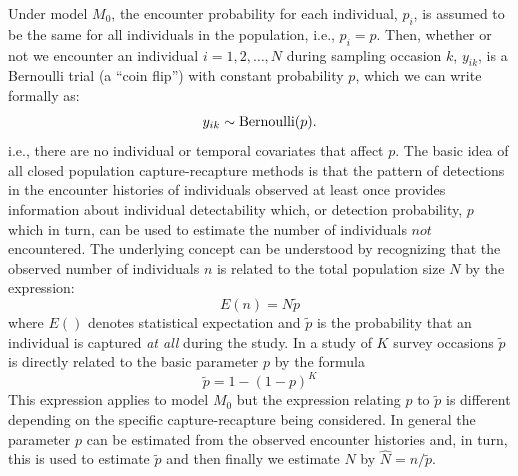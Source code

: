 \documentclass{book}
\begin{document}
Under model $M_0$, the encounter probability for each individual,
$p_i$, is assumed to be the same for all individuals in the
population, i.e., $p_i = p$. Then, whether or not we encounter an
individual $i=1,2,\ldots,N$ during sampling occasion $k$, $y_{ik}$, is a Bernoulli
trial (a ``coin flip'')
with constant probability $p$, which we can write formally as:
\[
y_{ik} \sim \hbox{Bernoulli}(p).
\]
i.e.,  there are no individual or temporal
covariates that affect $p$. The basic idea of all closed population
capture-recapture methods  is that the pattern of
detections in the encounter histories of individuals observed at least
once provides information about individual detectability which, or
detection probability, $p$ which in
turn, can be used to estimate the number of individuals $not$
encountered.  The underlying concept can be understood by recognizing
that  the observed number of
individuals $n$ is related to the total population size $N$ by the
expression:
\[
 E(n) = N\tilde{p}
\]
where $E()$ denotes statistical expectation and $\tilde{p}$ is the
probability that an individual is captured {\it at all} during the
study. In a study of $K$ survey occasions $\tilde{p}$ is directly
related to the basic parameter $p$ by the formula
\[
 \tilde{p} = 1-(1-p)^K
\]
This expression applies to model $M_0$ but the
 expression relating $p$ to $\tilde{p}$ is different depending on
the specific  capture-recapture being considered.
In general the parameter $p$ can be estimated from the observed
encounter histories and, in turn, this is used to estimate $\tilde{p}$
and then finally we estimate $N$ by $\hat{N} = n/\tilde{p}$.
\end{document}
